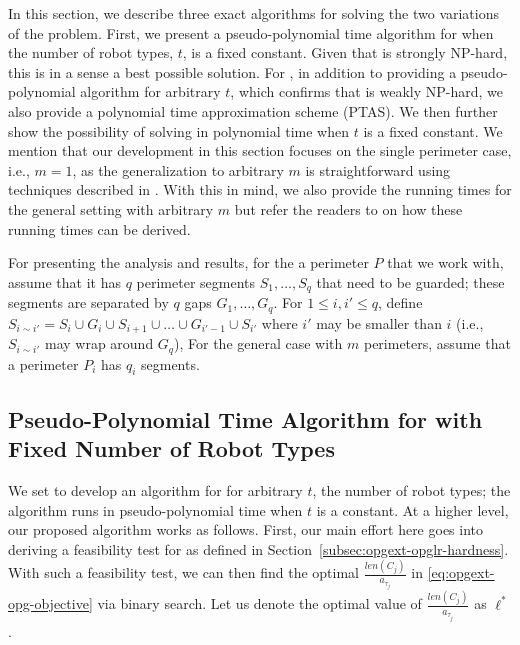 In this section, we describe three exact algorithms for solving the two 
variations of the \opg problem. First, we present a pseudo-polynomial time
algorithm for \opglr when the number of robot types, $t$, is a fixed constant. 
Given that \opglr is strongly NP-hard, this is in a sense a best possible 
solution. 
%
For \opgmc, in addition to providing a pseudo-polynomial algorithm for 
arbitrary $t$, which confirms that \opgmc is weakly NP-hard, we also provide
a polynomial time approximation scheme (PTAS). We then further show the 
possibility of solving \opgmc in polynomial time when $t$ is a fixed constant. 
We mention that our development in this section focuses on the single 
perimeter case, i.e., $m = 1$, as the generalization to arbitrary $m$ is 
straightforward using techniques described in \cite{fenghangaoyu2019efficient}. With this in mind, 
we also provide the running times for the general setting with arbitrary $m$ 
but refer the readers to \cite{fenghangaoyu2019efficient} on how these running times can be derived. 

For presenting the analysis and results, for the a perimeter $P$ that we work 
with, assume that it has $q$ perimeter segments $S_1, \ldots, S_q$ that need 
to be guarded; these segments are separated by $q$ gaps $G_1, \ldots, G_q$. 
For $1 \le i, i' \le q$, define $S_{i\sim i'} = S_i \cup G_i \cup S_{i+1} \cup \ldots 
\cup G_{i'-1} \cup S_{i'}$ where $i'$ may be smaller than $i$ (i.e., $S_{i\sim i'}$
may wrap around $G_q$),
For the general case with $m$ perimeters, assume that a perimeter $P_i$ has
$q_i$ segments. 
\begin{comment}
\jy{A paper, or anything with some level of complexity to digest, should be 
hierarchical. So, at the beginning of a section, it is good to explain a bit 
of what will be covered so a reader will have an idea of the structure of 
the section.}
\end{comment}

\subsection{Pseudo-Polynomial Time Algorithm for \opglr with Fixed Number
of Robot Types}
\def\inc{{\sc Inc}\xspace}
\def\knapsack{\textbf{\textsc{Knapsack}}\xspace}
\def\opglrfeasible{{\sc OPG-lr-Feasible}\xspace}
\def\opgmcdp{{\sc OPG-mc-DP}\xspace}
We set to develop an algorithm for \opglr for arbitrary $t$, the number of robot 
types; the algorithm runs in pseudo-polynomial time when $t$ is a constant. 
At a higher level, our proposed algorithm works as follows. First, our main effort 
here goes into deriving a feasibility test for \opglrd as defined in 
Section~\ref{subsec:opgext-opglr-hardness}. With such a feasibility test, we can then 
find the optimal $\frac{len(C_j)}{a_{\tau_j}}$ in \eqref{eq:opgext-opg-objective} via binary search.
Let us denote the optimal value of $\frac{len(C_j)}{a_{\tau_j}}$ as $\ell^*$. 

